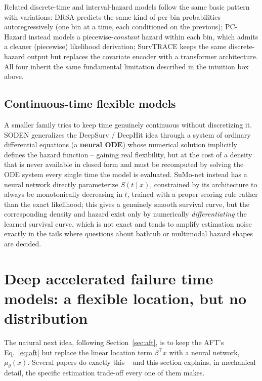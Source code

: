\documentclass[11pt]{article}
\begin{document}
Related discrete-time and interval-hazard models follow the same basic
pattern with variations: DRSA \citep{ren2019drsa} predicts the same kind
of per-bin probabilities autoregressively (one bin at a time, each
conditioned on the previous); PC-Hazard \citep{kvamme2021pchazard}
instead models a piecewise-\emph{constant} hazard within each bin, which
admits a cleaner (piecewise) likelihood derivation; SurvTRACE
\citep{wang2022survtrace} keeps the same discrete-hazard output but
replaces the covariate encoder with a transformer architecture. All four
inherit the same fundamental limitation described in the intuition box
above.

\subsection{Continuous-time flexible models}
A smaller family tries to keep time genuinely continuous without
discretizing it. SODEN \citep{tang2022soden} generalizes the DeepSurv /
DeepHit idea through a system of ordinary differential equations (a
\textbf{neural ODE}) whose numerical solution implicitly defines the
hazard function -- gaining real flexibility, but at the cost of a density
that is never available in closed form and must be recomputed by solving
the ODE system every single time the model is evaluated. SuMo-net
\citep{rindt2022sumonet} instead has a neural network directly
parameterize $S(t \mid x)$, constrained by its architecture to always be
monotonically decreasing in $t$, trained with a proper scoring rule
rather than the exact likelihood; this gives a genuinely smooth survival
curve, but the corresponding density and hazard exist only by
numerically \emph{differentiating} the learned survival curve, which is
not exact and tends to amplify estimation noise exactly in the tails
where questions about bathtub or multimodal hazard shapes are decided.

\section{Deep accelerated failure time models: a flexible location, but no distribution}
\label{sec:deepaft}

The natural next idea, following Section~\ref{sec:aft}, is to keep the
AFT's Eq.~\eqref{eq:aft} but replace the linear location term
$\beta^\top x$ with a neural network, $\mu_\theta(x)$. Several papers do
exactly this -- and this section explains, in mechanical detail, the
specific estimation trade-off every one of them makes.
\end{document}
